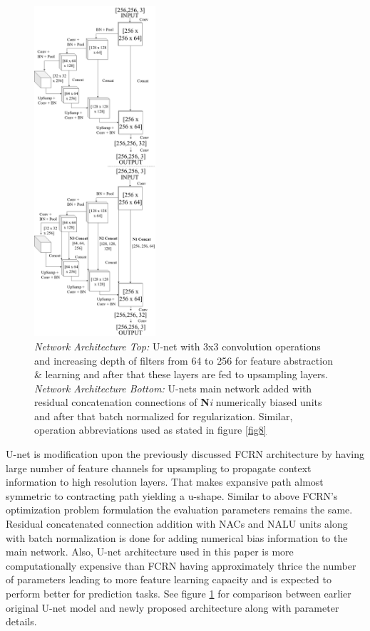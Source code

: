 \documentclass[conference]{IEEEtran}
\begin{document}
\begin{figure}[!h]
\centering
\includegraphics[width=0.40\textwidth]{u-net-abstract.png}
\caption{\textit{Network Architecture Top: }U-net with 3x3 convolution operations and increasing depth of filters from 64 to 256 for feature abstraction \& learning and after that these layers are fed to upsampling layers. \textit{Network Architecture Bottom: } U-nets main network added with residual concatenation connections of \textbf{N}\textit{i} numerically biased units and after that batch normalized for regularization. Similar, operation abbreviations used as stated in figure \ref{fig8} \newline}
\label{fig9}
\end{figure}

U-net is modification upon the previously discussed FCRN architecture by having large number of feature channels for upsampling to propagate context information to high resolution layers. That makes expansive path almost symmetric to contracting path yielding a u-shape. Similar to above FCRN's optimization problem formulation the evaluation parameters remains the same. Residual concatenated connection addition with NACs and NALU units along with batch normalization is done for adding numerical bias information to the main network. Also, U-net architecture used in this paper is more computationally expensive than FCRN having approximately thrice the number of parameters leading to more feature learning capacity and is expected to perform better for prediction tasks. See figure \ref{fig9} for comparison between earlier original U-net model and newly proposed architecture along with parameter details.
\end{document}
